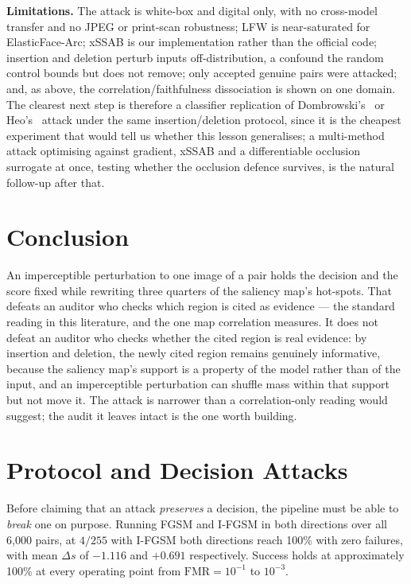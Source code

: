 \documentclass[conference,10pt]{IEEEtran}
\newcommand{\dsim}{\Delta s}
\begin{document}
\textbf{Limitations.} The attack is white-box and digital only, with no cross-model transfer
and no JPEG or print-scan robustness; LFW is near-saturated for ElasticFace-Arc; xSSAB is our
implementation rather than the official code; insertion and deletion perturb inputs
off-distribution, a confound the random control bounds but does not remove; only accepted
genuine pairs were attacked; and, as above, the correlation/faithfulness dissociation is shown
on one domain. The clearest next step is therefore a classifier replication of
Dombrowski's~\cite{dombrowski2019explanations} or Heo's~\cite{heo2019fooling} attack under the
same insertion/deletion protocol, since it is the cheapest experiment that would tell us
whether this lesson generalises; a multi-method attack optimising against gradient, xSSAB and a
differentiable occlusion surrogate at once, testing whether the occlusion defence survives, is
the natural follow-up after that.

\section{Conclusion}

An imperceptible perturbation to one image of a pair holds the decision and the score fixed
while rewriting three quarters of the saliency map's hot-spots. That defeats an auditor who
checks which region is cited as evidence — the standard reading in this literature, and the one
map correlation measures. It does not defeat an auditor who checks whether the cited region is
real evidence: by insertion and deletion, the newly cited region remains genuinely informative,
because the saliency map's support is a property of the model rather than of the input, and an
imperceptible perturbation can shuffle mass within that support but not move it. The attack is
narrower than a correlation-only reading would suggest; the audit it leaves intact is the one
worth building.




\appendices
\section{Protocol and Decision Attacks}
\label{app:decision}

Before claiming that an attack \emph{preserves} a decision, the pipeline must be able to
\emph{break} one on purpose. Running FGSM and I-FGSM in both directions over all 6{,}000
pairs, at $4/255$ with I-FGSM both directions reach 100\% with zero failures, with mean
$\dsim$ of $-1.116$ and $+0.691$ respectively. Success holds at approximately 100\% at every
operating point from $\mathrm{FMR} = 10^{-1}$ to $10^{-3}$.
\end{document}
